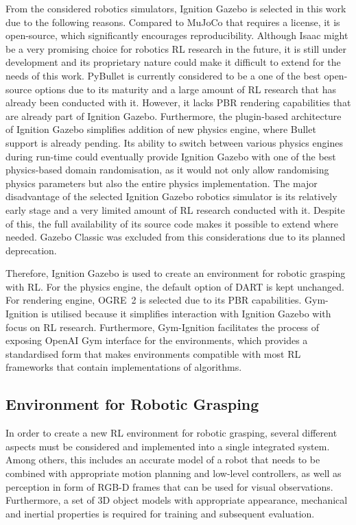 From the considered robotics simulators, Ignition Gazebo is selected in this work due to the following reasons. Compared to MuJoCo that requires a license, it is open-source, which significantly encourages reproducibility. Although Isaac might be a very promising choice for robotics RL research in the future, it is still under development and its proprietary nature could make it difficult to extend for the needs of this work. PyBullet is currently considered to be a one of the best open-source options due to its maturity and a large amount of RL research that has already been conducted with it. However, it lacks PBR rendering capabilities that are already part of Ignition Gazebo. Furthermore, the plugin-based architecture of Ignition Gazebo simplifies addition of new physics engine, where Bullet support is already pending. Its ability to switch between various physics engines during run-time could eventually provide Ignition Gazebo with one of the best physics-based domain randomisation, as it would not only allow randomising physics parameters but also the entire physics implementation. The major disadvantage of the selected Ignition Gazebo robotics simulator is its relatively early stage and a very limited amount of RL research conducted with it. Despite of this, the full availability of its source code makes it possible to extend where needed. Gazebo Classic was excluded from this considerations due to its planned deprecation.

Therefore, Ignition Gazebo is used to create an environment for robotic grasping with RL. For the physics engine, the default option of DART is kept unchanged. For rendering engine, OGRE~2 is selected due to its PBR capabilities. Gym-Ignition \cite{ferigo_gym-ignition_2020} is utilised because it simplifies interaction with Ignition Gazebo with focus on RL research. Furthermore, Gym-Ignition facilitates the process of exposing OpenAI Gym \cite{brockman_openai_2016} interface for the environments, which provides a standardised form that makes environments compatible with most RL frameworks that contain implementations of algorithms.


\subsection{Environment for Robotic Grasping}

In order to create a new RL environment for robotic grasping, several different aspects must be considered and implemented into a single integrated system. Among others, this includes an accurate model of a robot that needs to be combined with appropriate motion planning and low-level controllers, as well as perception in form of RGB-D frames that can be used for visual observations. Furthermore, a set of 3D object models with appropriate appearance, mechanical and inertial properties is required for training and subsequent evaluation.


